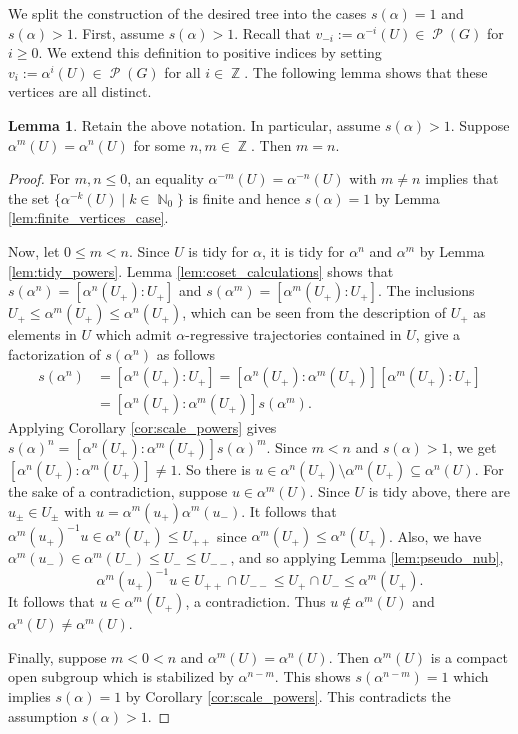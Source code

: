 \documentclass{article}
\DeclareMathOperator\bbN{\mathbb{N}}
\DeclareMathOperator\bbZ{\mathbb{Z}}
\DeclareMathOperator\calP{\mathcal{P}}
\theoremstyle{definition}
\newtheorem{lemma}[theorem]{Lemma}
\begin{document}
We split the construction of the desired tree into the cases $s(\alpha)=1$ and $s(\alpha)>1$. First, assume $s(\alpha)>1$. Recall that $v_{-i}:=\alpha^{-i}(U)\in\calP(G)$ for $i\ge 0$. We extend this definition to positive indices by setting $v_{i}:=\alpha^{i}(U)\in\calP(G)$ for all $i\in\bbZ$. The following lemma shows that these vertices are all distinct.

\begin{lemma}\label{lem:distinct_vertices}
Retain the above notation. In particular, assume $s(\alpha)>1$. Suppose $\alpha^{m}(U) = \alpha^{n}(U)$ for some $n,m\in\bbZ$. Then $m = n$.
\end{lemma}

\begin{proof}
For $m,n\le 0$, an equality $\alpha^{-m}(U)=\alpha^{-n}(U)$ with $m\neq n$ implies that the set $\{\alpha^{-k}(U)\mid k\in\bbN_{0}\}$ is finite and hence $s(\alpha)=1$ by Lemma \ref{lem:finite_vertices_case}.

Now, let $0\le m<n$. Since $U$ is tidy for $\alpha$, it is tidy for $\alpha^n$ and $\alpha^m$ by Lemma \ref{lem:tidy_powers}. Lemma \ref{lem:coset_calculations} shows that $s(\alpha^n) = [\alpha^n(U_+):U_+]$ and $s(\alpha^m) = [\alpha^m(U_+):U_+]$. The inclusions $U_+\le \alpha^m(U_+)\le \alpha^n(U_+)$, which can be seen from the description of $U_+$ as elements in $U$ which admit $\alpha$-regressive trajectories contained in $U$, give a factorization of $s(\alpha^n)$ as follows
\begin{align*} s(\alpha^n) &= [\alpha^n(U_+):U_+] = [\alpha^n(U_+):\alpha^m(U_+)][\alpha^m(U_+):U_+]\\
& = [\alpha^n(U_+):\alpha^m(U_+)]s(\alpha^m).
\end{align*} 
Applying Corollary \ref{cor:scale_powers} gives $s(\alpha)^n = [\alpha^n(U_+):\alpha^m(U_+)]s(\alpha)^m$. Since $m < n$ and $s(\alpha)>1$, we get $[\alpha^{n}(U_+):\alpha^{m}(U_+)]\!\neq\! 1$. So there is $u\!\in\! \alpha^{n}(U_+)\!\setminus \alpha^{m}(U_+)\!\subseteq\! \alpha^{n}(U)$. For the sake of a contradiction, suppose $u\in \alpha^{m}(U)$. Since $U$ is tidy above, there are $u_{\pm}\in U_{\pm}$ with $u =\alpha^{m}(u_+)\alpha^{m}(u_-)$. It follows that $\alpha^{m}(u_+)^{-1}u \in \alpha^{n}(U_+)\le U_{++}$ since $\alpha^{m}(U_{+})\le \alpha^{n}(U_{+})$. Also, we have $\alpha^{m}(u_-)\in \alpha^{m}(U_{-})\le U_{-}\le U_{--}$, and so applying Lemma \ref{lem:pseudo_nub}, 
\[\alpha^{m}(u_+)^{-1}u\in U_{++}\cap U_{--}\le U_+\cap U_-\le \alpha^{m}(U_+).\]
It follows that $u\in\alpha^{m}(U_+)$, a contradiction. Thus $u\not\in\alpha^{m}(U)$ and $\alpha^{n}(U)\!\neq\! \alpha^{m}(U)$.

Finally, suppose $m < 0 < n$ and $\alpha^{m}(U) = \alpha^{n}(U)$. Then $\alpha^{m}(U)$ is a compact open subgroup which is stabilized by $\alpha^{n-m}$. This shows $s(\alpha^{n - m}) = 1$ which implies $s(\alpha) = 1$ by Corollary \ref{cor:scale_powers}. This contradicts the assumption $s(\alpha) > 1$.
\end{proof}
\end{document}
